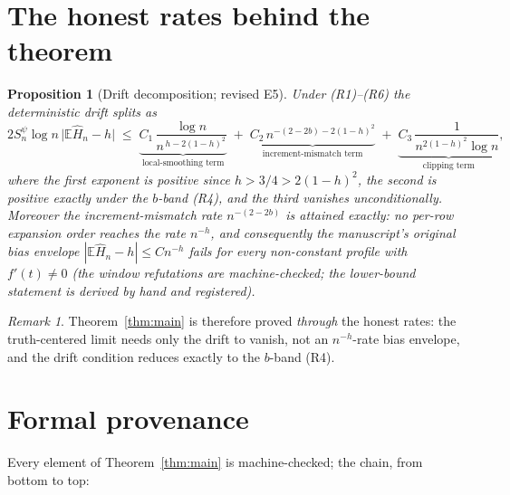 \documentclass[11pt]{article}
\newtheorem{proposition}[theorem]{Proposition}
\theoremstyle{definition}
\theoremstyle{remark}
\newtheorem{remark}[theorem]{Remark}
\begin{document}
\section{The honest rates behind the theorem}

\begin{proposition}[Drift decomposition; revised E5]\label{prop:rates}
Under \textup{(R1)}--\textup{(R6)} the deterministic drift splits as
\[
2 S_n^{\psi}\log n\,\bigl|\mathbb{E}\widehat H_n - h\bigr|
\;\le\;
\underbrace{C_1\,\frac{\log n}{n^{\,h - 2(1-h)^2}}}_{\text{local-smoothing term}}
\;+\;
\underbrace{C_2\, n^{-(2-2b) - 2(1-h)^2}}_{\text{increment-mismatch term}}
\;+\;
\underbrace{C_3\,\frac{1}{n^{2(1-h)^2}\log n}}_{\text{clipping term}},
\]
where the first exponent is positive since $h>3/4 > 2(1-h)^2$, the second is
positive exactly under the $b$-band \textup{(R4)}, and the third vanishes
unconditionally. Moreover the increment-mismatch rate
$n^{-(2-2b)}$ is attained exactly: no per-row expansion order reaches the rate
$n^{-h}$, and consequently the manuscript's original bias envelope
$|\mathbb{E}\widehat H_n - h| \le C n^{-h}$ fails for every non-constant
profile with $f'(t)\neq 0$ (the window refutations are machine-checked; the
lower-bound statement is derived by hand and registered).
\end{proposition}

\begin{remark}
Theorem~\ref{thm:main} is therefore proved \emph{through} the honest rates: the
truth-centered limit needs only the drift to vanish, not an $n^{-h}$-rate bias
envelope, and the drift condition reduces exactly to the $b$-band (R4).
\end{remark}

\section{Formal provenance}\label{sec:prov}

Every element of Theorem~\ref{thm:main} is machine-checked; the chain, from
bottom to top:
\end{document}
